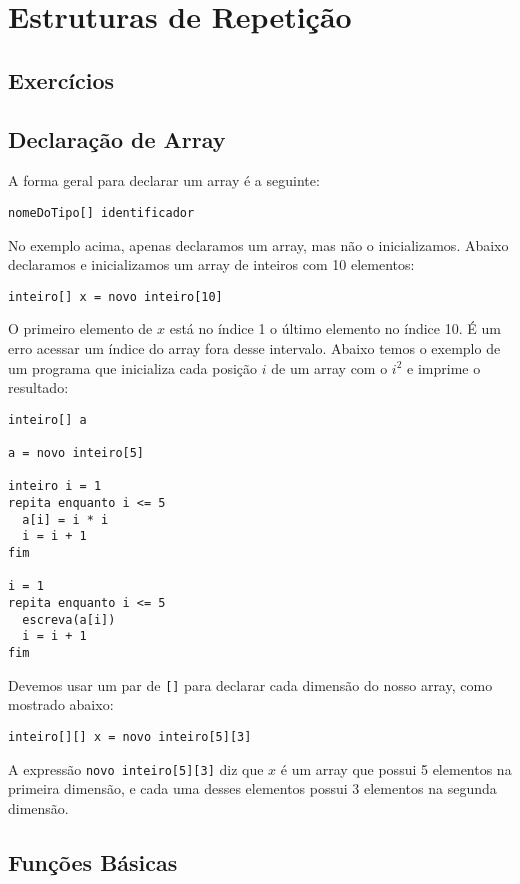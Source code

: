 \documentclass{report}
\begin{document}
\chapter{Estruturas de Repetição}



\section{Exercícios}




\section{Declaração de Array}

A forma geral para declarar um array é a seguinte: 
\begin{verbatim}
nomeDoTipo[] identificador
\end{verbatim}

No exemplo acima, apenas declaramos um array, mas não o
inicializamos. Abaixo declaramos e inicializamos um
array de inteiros com 10 elementos:
\begin{verbatim}
inteiro[] x = novo inteiro[10]
\end{verbatim}

O primeiro elemento de $x$ está no índice 1 o último
elemento no índice 10. É um erro acessar um índice do
array fora desse intervalo. Abaixo temos o exemplo de
um programa que inicializa cada posição $i$ de um array
com o $i^2$ e imprime o resultado:
\begin{verbatim}
inteiro[] a

a = novo inteiro[5]

inteiro i = 1
repita enquanto i <= 5
  a[i] = i * i
  i = i + 1
fim

i = 1
repita enquanto i <= 5
  escreva(a[i])
  i = i + 1
fim
\end{verbatim}


Devemos usar um par de \texttt{[]} para declarar cada dimensão
do nosso array, como mostrado abaixo: 
\begin{verbatim}
inteiro[][] x = novo inteiro[5][3]
\end{verbatim}

A expressão \texttt{novo inteiro[5][3]} diz que $x$ é um
array que possui 5 elementos na primeira dimensão, e cada
uma desses elementos possui 3 elementos na segunda dimensão.


\section{Funções Básicas}
\end{document}
